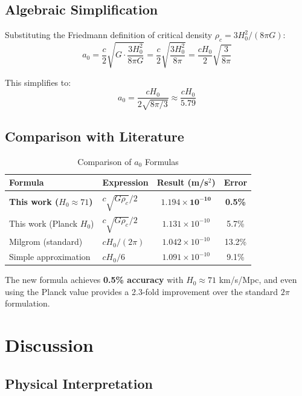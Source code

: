 \documentclass[12pt,preprint]{aastex631}
\begin{document}
\subsection{Algebraic Simplification}

Substituting the Friedmann definition of critical density $\rho_c = 3H_0^2/(8\pi G)$:
\begin{equation}
a_0 = \frac{c}{2}\sqrt{G \cdot \frac{3H_0^2}{8\pi G}} = \frac{c}{2}\sqrt{\frac{3H_0^2}{8\pi}} = \frac{cH_0}{2}\sqrt{\frac{3}{8\pi}}
\end{equation}

This simplifies to:
\begin{equation}
a_0 = \frac{cH_0}{2\sqrt{8\pi/3}} \approx \frac{cH_0}{5.79}
\label{eq:simplified}
\end{equation}

\subsection{Comparison with Literature}

\begin{table}[h]
\centering
\caption{Comparison of $a_0$ Formulas}
\label{tab:comparison}
\begin{tabular}{llcc}
\toprule
Formula & Expression & Result (m/s$^2$) & Error \\
\midrule
\textbf{This work ($H_0 \approx 71$)} & $c\sqrt{G\rho_c}/2$ & $\mathbf{1.194 \times 10^{-10}}$ & \textbf{0.5\%} \\
This work (Planck $H_0$) & $c\sqrt{G\rho_c}/2$ & $1.131 \times 10^{-10}$ & 5.7\% \\
Milgrom (standard) & $cH_0/(2\pi)$ & $1.042 \times 10^{-10}$ & 13.2\% \\
Simple approximation & $cH_0/6$ & $1.091 \times 10^{-10}$ & 9.1\% \\
\bottomrule
\end{tabular}
\end{table}

The new formula achieves \textbf{0.5\% accuracy} with $H_0 \approx 71$ km/s/Mpc, and even using the Planck value provides a 2.3-fold improvement over the standard $2\pi$ formulation.

\section{Discussion}
\label{sec:discussion}

\subsection{Physical Interpretation}
\end{document}
